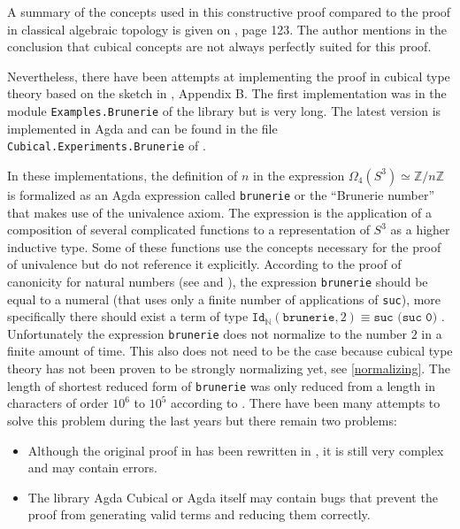 \documentclass[12pt,a4paper,twoside,xetex,draft]{book}
\begin{document}
A summary of the concepts used in this constructive proof compared to the proof in classical algebraic topology is given on \cite{Brunerie2016}, page 123. The author mentions in the conclusion that cubical concepts are not always perfectly suited for this proof. 

Nevertheless, there have been attempts at implementing the proof in cubical type theory based on the sketch in \cite{Brunerie2016}, Appendix B. The first implementation was in the module \texttt{Examples.Brunerie} of the library \cite{Moertberg2015} but is very long. The latest version is implemented in Agda and can be found in the file  \texttt{Cubical.Experiments.Brunerie} of \cite{Moertberg2018}. 

In these implementations, the definition of  $n$ in the expression $\Omega_4(S^3) \simeq \mathbb{Z}/n\mathbb{Z}$ is formalized as an Agda expression called \texttt{brunerie} or the ``Brunerie number'' that makes use of the univalence axiom. The expression is the application of a composition of several complicated functions to a representation of $S^3$ as a higher inductive type. Some of these functions use the concepts necessary for the proof of univalence but do not reference it explicitly. According to the proof of canonicity for natural numbers (see \cite{Huber2017} and \cite{Coquand2019}), the expression \texttt{brunerie} should be equal to a numeral (that uses only a finite number of applications of \texttt{suc}),  more specifically there should exist a term of type $\texttt{Id}_{\mathbb{N}}(\texttt{brunerie},2) \equiv \texttt{suc (suc 0)}$ . Unfortunately the expression \texttt{brunerie} does not normalize to the number $2$ in a finite amount of time. This also does not need to be the case because cubical type theory has not been proven to be strongly normalizing yet, see \cref{normalizing}. The length of shortest reduced form of  \texttt{brunerie} was  only reduced from a length in characters of order $10^6$ to $10^5$ according to \cite{Brunerie2018}. There have been many attempts to solve this problem during the last years but there remain two problems:
\begin{itemize}
\item Although the original proof in \cite{Moertberg2015} has been rewritten in \cite{Moertberg2018}, it is still very complex and may contain errors.
\item The library Agda Cubical or Agda itself may contain bugs that prevent the proof from generating valid terms and reducing them correctly.
\end{itemize}
\end{document}
